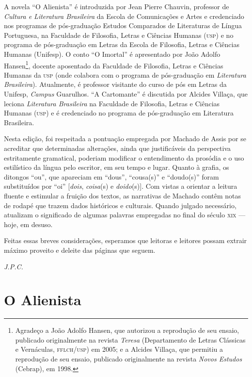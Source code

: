 A novela ``O Alienista'' é introduzida por Jean Pierre Chauvin,
professor de \emph{Cultura e Literatura Brasileira} da Escola de
Comunicações e Artes e credenciado nos programas de pós-graduação
Estudos Comparados de Literaturas de Língua Portuguesa, na Faculdade de
Filosofia, Letras e Ciências Humanas (\textsc{usp}) e no programa de
pós-graduação em Letras da Escola de Filosofia, Letras e Ciências
Humanas (Unifesp). O conto ``O Imortal'' é apresentado por João Adolfo
Hansen\footnote{Agradeço a João Adolfo Hansen, que autorizou a
  reprodução de seu ensaio, publicado originalmente na revista
  \emph{Teresa} (Departamento de Letras Clássicas e Vernáculas,
  \textsc{fflch}/\textsc{usp}) em 2005; e a Alcides Villaça, que permitiu a reprodução de
  seu ensaio, publicado originalmente na revista \emph{Novos Estudos}
  (Cebrap), em 1998.}, docente aposentado da Faculdade de Filosofia,
Letras e Ciências Humanas da \textsc{usp} (onde colabora com o programa de
pós-graduação em \emph{Literatura Brasileira}). Atualmente, é professor
visitante do curso de pós em Letras da Unifesp, \emph{Campus} Guarulhos.
``A Cartomante'' é discutida por Alcides Villaça, que leciona
\emph{Literatura Brasileira} na Faculdade de Filosofia, Letras e
Ciências Humanas (\textsc{usp}) e é credenciado no programa de pós-graduação em
Literatura Brasileira.

Nesta edição, foi respeitada a pontuação empregada por Machado de Assis
por se acreditar que determinadas alterações, ainda que justificáveis da
perspectiva estritamente gramatical, poderiam modificar o entendimento
da prosódia e o uso estilístico da língua pelo escritor, em seu tempo e
lugar. Quanto à grafia, os ditongos ``ou'', que apareciam em ``dous'',
``cousa(s)'' e ``doudo(s)'' foram substituídos por ``oi''
{[}\emph{dois}, \emph{coisa}(s) e \emph{doido}(s){]}. Com vistas a
orientar a leitura fluente e estimular a fruição dos textos, as
narrativas de Machado contêm notas de rodapé que trazem dados históricos
e culturais. Quando julgado necessário, atualizam o significado de
algumas palavras empregadas no final do século \textsc{xix} --- hoje, em desuso.

Feitas essas breves considerações, esperamos que leitoras e leitores
possam extrair máximo proveito e deleite das páginas que seguem.

\bigskip

\hfill{}\emph{J.P.C.}

\part{O Alienista}

